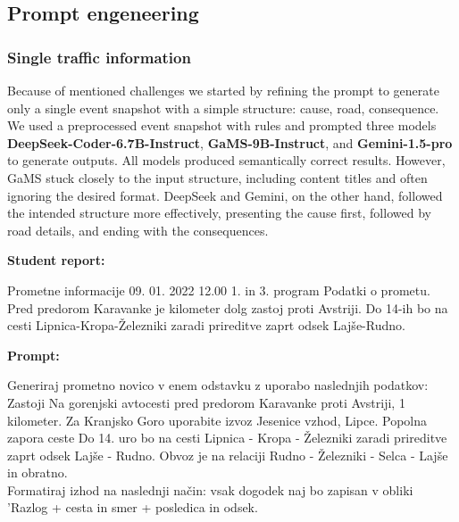 \documentclass[fleqn,moreauthors,10pt]{ds_report}
\begin{document}
\subsection*{Prompt engeneering}

\subsubsection*{Single traffic information}

Because of mentioned challenges we started by refining the prompt to generate only a single event snapshot with a simple structure: cause, road, consequence. We used a preprocessed event snapshot with rules and prompted three models \textbf{DeepSeek-Coder-6.7B-Instruct}, \textbf{GaMS-9B-Instruct}, and \textbf{Gemini-1.5-pro} to generate outputs. All models produced semantically correct results. However, GaMS stuck closely to the input structure, including content titles and often ignoring the desired format. DeepSeek and Gemini, on the other hand, followed the intended structure more effectively, presenting the cause first, followed by road details, and ending with the consequences.

\noindent
\textbf{Student report:}
\begin{scriptsize}
Prometne informacije       09. 01. 2022       12.00                1. in 3. program 
Podatki o prometu.
Pred predorom Karavanke je kilometer dolg zastoj proti Avstriji.
Do 14-ih bo na cesti Lipnica-Kropa-Železniki zaradi prireditve zaprt odsek Lajše-Rudno.
\par
\end{scriptsize}

\vspace{0.3cm} %

\noindent
\textbf{Prompt:}
\begin{scriptsize}
Generiraj prometno novico v enem odstavku z uporabo naslednjih podatkov:
Zastoji Na gorenjski avtocesti pred predorom Karavanke proti Avstriji, 1 kilometer. Za Kranjsko Goro uporabite izvoz Jesenice vzhod, Lipce. Popolna zapora ceste Do 14. uro bo na cesti Lipnica - Kropa - Železniki zaradi prireditve zaprt odsek Lajše - Rudno. Obvoz je na relaciji Rudno - Železniki - Selca - Lajše in obratno. \\
Formatiraj izhod na naslednji način: vsak dogodek naj bo zapisan v obliki 'Razlog + cesta in smer + posledica in odsek.
\par
\end{scriptsize}
\end{document}
